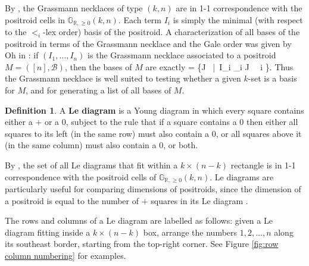 \documentclass[11pt]{article}
\newcommand{\R}{\mathbb{R}}
\newcommand{\Gr}{\mathbb{G}_{\R, \geq 0}}
\def\ba #1\ea{\begin{align} #1 \end{align}}
\newcommand{\cB}{\mathcal{B}}
\newcommand{\gale}[1]{\preccurlyeq_{#1}}
\theoremstyle{remark}
\theoremstyle{definition}
\newtheorem{dfn}[thm]{Definition}
\begin{document}
By \cite[Theorem 17.1]{Postnikov}, the Grassmann necklaces of type $(k,n)$ are in 1-1 correspondence with the positroid cells in $\Gr(k,n)$. Each term $I_i$ is simply the minimal (with respect to the $<_i$-lex order) basis of the positroid. A characterization of all bases of the positroid in terms of the Grassmann necklace and the Gale order was given by Oh in \cite[Theorem 8]{Oh}: if $(I_1, \dots, I_n)$ is the Grassmann necklace associated to a positroid $M = ([n],\cB)$, then the bases of $M$ are exactly
\ba \cB = \left\{J \in {}\ \Big|\ I_i \gale{i} J \ \ \forall i \in [n]\right\}. \label{basesofmatroids}\ea
Thus the Grassmann necklace is well suited to testing whether a given $k$-set is a basis for $M$, and for generating a list of all bases of $M$.


\begin{dfn}\label{def:le diagram}
A {\bf Le diagram} is a Young diagram in which every square contains either a $+$ or a $0$, subject to the rule that if a square contains a $0$ then either all squares to its left (in the same row) must also contain a $0$, or all squares above it (in the same column) must also contain a $0$, or both.
\end{dfn}

By \cite[Theorem 6.5]{Postnikov}, the set of all Le diagrams that fit within a $k\times(n-k)$ rectangle is in 1-1 correspondence with the positroid cells of $\Gr(k,n)$. Le diagrams are particularly useful for comparing dimensions of positroids, since the dimension of a positroid is equal to the number of $+$ squares in its Le diagram \cite[Theorem 6.5]{Postnikov}.

The rows and columns of a Le diagram are labelled as follows:  given a Le diagram fitting inside a $k\times (n-k)$ box, arrange the numbers $1,2, \dots, n$ along its southeast border, starting from the top-right corner. See Figure \ref{fig:row column numbering} for examples.
\end{document}

